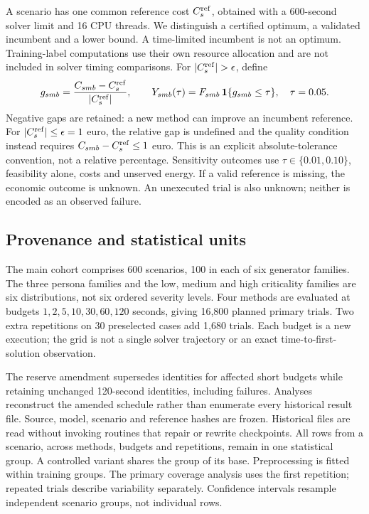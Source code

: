 A scenario has one common reference cost $C_s^{\rm ref}$, obtained with a
600-second solver limit and 16 CPU threads. We distinguish a certified optimum,
a validated incumbent and a lower bound. A time-limited incumbent is not an
optimum. Training-label computations use their own resource allocation and are
not included in solver timing comparisons. For $|C_s^{\rm ref}|>\epsilon$, define
\begin{equation}
 g_{smb}=\frac{C_{smb}-C_s^{\rm ref}}{|C_s^{\rm ref}|},\qquad
 Y_{smb}(\tau)=F_{smb}\,\mathbf{1}\{g_{smb}\leq\tau\},\quad \tau=0.05.
 \label{eq:economic}
\end{equation}
Negative gaps are retained: a new method can improve an incumbent reference.
For $|C_s^{\rm ref}|\leq\epsilon=1$ euro, the relative gap is undefined and the
quality condition instead requires $C_{smb}-C_s^{\rm ref}\leq1$ euro. This is an
explicit absolute-tolerance convention, not a relative percentage. Sensitivity
outcomes use $\tau\in\{0.01,0.10\}$, feasibility alone, costs and unserved energy.
If a valid reference is missing, the economic outcome is unknown. An unexecuted
trial is also unknown; neither is encoded as an observed failure.

\subsection{Provenance and statistical units}
The main cohort comprises 600 scenarios, 100 in each of six generator families.
The three persona families and the low, medium and high criticality families
are six distributions, not six ordered severity levels. Four methods are
evaluated at budgets $1,2,5,10,30,60,120$ seconds, giving 16,800 planned primary
trials. Two extra repetitions on 30 preselected cases add 1,680 trials.
Each budget is a new execution; the grid is not a single solver trajectory or
an exact time-to-first-solution observation.

The reserve amendment supersedes identities for affected short budgets while
retaining unchanged 120-second identities, including failures. Analyses reconstruct
the amended schedule rather than enumerate every historical result file.
Source, model, scenario and reference hashes are frozen. Historical files are
read without invoking routines that repair or rewrite checkpoints.
All rows from a scenario, across methods, budgets and repetitions, remain in
one statistical group. A controlled variant shares the group of its base.
Preprocessing is fitted within training groups. The primary coverage analysis
uses the first repetition; repeated trials describe variability separately.
Confidence intervals resample independent scenario groups, not individual rows.
